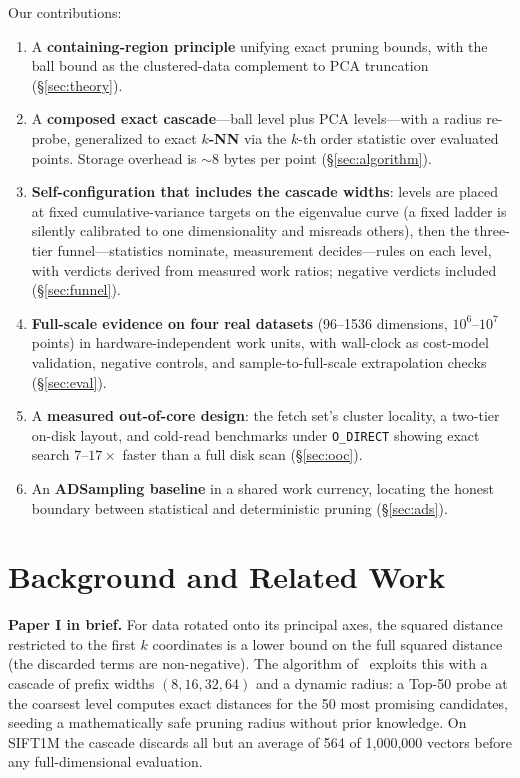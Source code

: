 \documentclass[sigconf,nonacm]{acmart}
\begin{document}
Our contributions:
\begin{enumerate}
\item A \textbf{containing-region principle} unifying exact pruning bounds,
  with the ball bound as the clustered-data complement to PCA truncation
  (\S\ref{sec:theory}).
\item A \textbf{composed exact cascade}---ball level plus PCA levels---with
  a radius re-probe, generalized to exact \textbf{$k$-NN} via the $k$-th
  order statistic over evaluated points. Storage overhead is $\sim$8 bytes
  per point (\S\ref{sec:algorithm}).
\item \textbf{Self-configuration that includes the cascade widths}: levels
  are placed at fixed cumulative-variance targets on the eigenvalue curve
  (a fixed ladder is silently calibrated to one dimensionality and misreads
  others), then the three-tier funnel---statistics nominate, measurement
  decides---rules on each level, with verdicts derived from measured work
  ratios; negative verdicts included (\S\ref{sec:funnel}).
\item \textbf{Full-scale evidence on four real datasets} (96--1536
  dimensions, $10^6$--$10^7$ points) in hardware-independent work units,
  with wall-clock as cost-model validation, negative controls, and
  sample-to-full-scale extrapolation checks (\S\ref{sec:eval}).
\item A \textbf{measured out-of-core design}: the fetch set's cluster
  locality, a two-tier on-disk layout, and cold-read benchmarks under
  \texttt{O\_DIRECT} showing exact search $7$--$17\times$ faster than a
  full disk scan (\S\ref{sec:ooc}).
\item An \textbf{ADSampling baseline} in a shared work currency, locating
  the honest boundary between statistical and deterministic pruning
  (\S\ref{sec:ads}).
\end{enumerate}

\section{Background and Related Work}

\textbf{Paper I in brief.} For data rotated onto its principal axes, the
squared distance restricted to the first $k$ coordinates is a lower bound on
the full squared distance (the discarded terms are non-negative). The
algorithm of~\cite{paper1} exploits this with a cascade of prefix widths
$(8, 16, 32, 64)$ and a dynamic radius: a Top-50 probe at the coarsest level
computes exact distances for the 50 most promising candidates, seeding a
mathematically safe pruning radius without prior knowledge. On SIFT1M the
cascade discards all but an average of 564 of 1{,}000{,}000 vectors before
any full-dimensional evaluation.
\end{document}
